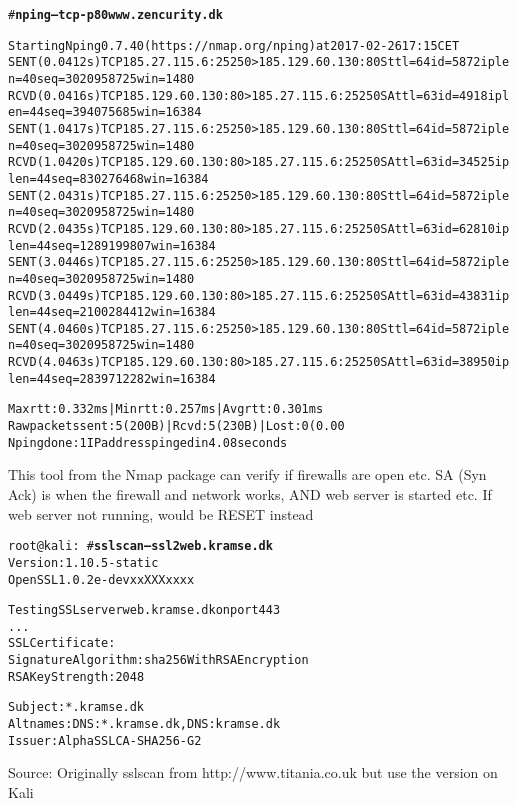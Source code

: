 \documentclass[Screen16to9,17pt]{foils}
\begin{document}
\begin{alltt}\tiny
# {\bf nping --tcp -p80 www.zencurity.dk}

Starting Nping 0.7.40 ( https://nmap.org/nping ) at 2017-02-26 17:15 CET
SENT (0.0412s) {\color{darkgreen}TCP 185.27.115.6:25250 > 185.129.60.130:80 S} ttl=64 id=5872 iplen=40  seq=3020958725 win=1480
RCVD (0.0416s) {\color{darkgreen}TCP 185.129.60.130:80 > 185.27.115.6:25250 SA} ttl=63 id=4918 iplen=44  seq=394075685 win=16384
SENT (1.0417s) TCP 185.27.115.6:25250 > 185.129.60.130:80 S ttl=64 id=5872 iplen=40  seq=3020958725 win=1480
RCVD (1.0420s) TCP 185.129.60.130:80 > 185.27.115.6:25250 SA ttl=63 id=34525 iplen=44  seq=830276468 win=16384
SENT (2.0431s) TCP 185.27.115.6:25250 > 185.129.60.130:80 S ttl=64 id=5872 iplen=40  seq=3020958725 win=1480
RCVD (2.0435s) TCP 185.129.60.130:80 > 185.27.115.6:25250 SA ttl=63 id=62810 iplen=44  seq=1289199807 win=16384
SENT (3.0446s) TCP 185.27.115.6:25250 > 185.129.60.130:80 S ttl=64 id=5872 iplen=40  seq=3020958725 win=1480
RCVD (3.0449s) TCP 185.129.60.130:80 > 185.27.115.6:25250 SA ttl=63 id=43831 iplen=44  seq=2100284412 win=16384
SENT (4.0460s) TCP 185.27.115.6:25250 > 185.129.60.130:80 S ttl=64 id=5872 iplen=40  seq=3020958725 win=1480
RCVD (4.0463s) TCP 185.129.60.130:80 > 185.27.115.6:25250 SA ttl=63 id=38950 iplen=44  seq=2839712282 win=16384

Max rtt: 0.332ms | Min rtt: 0.257ms | Avg rtt: 0.301ms
Raw packets sent: 5 (200B) | Rcvd: 5 (230B) | Lost: 0 (0.00%)
Nping done: 1 IP address pinged in 4.08 seconds
\end{alltt}

This tool from the Nmap package can verify if firewalls are open etc.
SA (Syn Ack) is when the firewall and network works, AND web server is started etc.
If web server not running, would be RESET instead


\begin{alltt}\small
root@kali:~# {\bf sslscan --ssl2 web.kramse.dk}
Version: 1.10.5-static
OpenSSL 1.0.2e-dev xx XXX xxxx

Testing SSL server web.kramse.dk on port 443
...
  SSL Certificate:
Signature Algorithm: sha256WithRSAEncryption
RSA Key Strength:    2048

Subject:  *.kramse.dk
Altnames: DNS:*.kramse.dk, DNS:kramse.dk
Issuer:   AlphaSSL CA - SHA256 - G2
\end{alltt}

Source:
Originally sslscan from http://www.titania.co.uk
 but use the version on Kali
\end{document}

